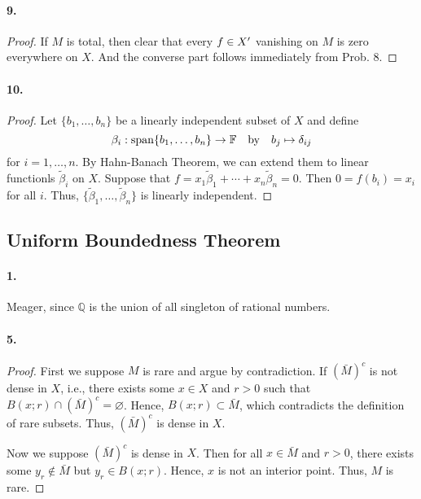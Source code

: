   \paragraph{9.}
  \begin{proof}
    If $M$ is total, then clear that every $f\in X^\prime$ vanishing on $M$ is zero
    everywhere on $X$. And the converse part follows immediately from Prob. 8.
  \end{proof}
  
  \paragraph{10.}
  \begin{proof}
    Let $\{b_1,\dots,b_n\}$ be a linearly independent subset of $X$ and define
    \[
      \beta_i:\operatorname{span}\{b_1,\dots,b_n\}\to\mathbb{F} 
      \quad\text{by}\quad
      b_j\mapsto\delta_{ij}
    \]
    for $i=1,\dots,n$. By Hahn-Banach Theorem, we can extend them to linear 
    functionls $\tilde{\beta}_i$ on $X$. Suppose that $f=x_1\tilde{\beta}_1+
    \cdots+x_n\tilde{\beta}_n=0$. Then $0=f(b_i)=x_i$ for all $i$. Thus, $\{
    \tilde{\beta}_1,\dots,\tilde{\beta}_n\}$ is linearly independent.
  \end{proof}
\subsection{Uniform Boundedness Theorem}
  \paragraph{1.}
  \begin{solution}
    Meager, since $\mathbb{Q}$ is the union of all singleton of rational 
    numbers.
  \end{solution}
  
  \paragraph{5.}
  \begin{proof}
    First we suppose $M$ is rare and argue by contradiction. If $(\bar{M})^c$ is
    not dense in $X$, i.e., there exists some $x\in X$ and $r>0$ such that $B(x;
    r)\cap(\bar{M})^c=\varnothing$. Hence, $B(x;r)\subset\bar{M}$, which 
    contradicts the definition of rare subsets. Thus, $(\bar{M})^c$ is dense in
    $X$.\par
    Now we suppose $(\bar{M})^c$ is dense in $X$. Then for all $x\in\bar{M}$ and
    $r>0$, there exists some $y_r\notin\bar{M}$ but $y_r\in B(x;r)$. Hence, $x$
    is not an interior point. Thus, $M$ is rare.
  \end{proof}
  
